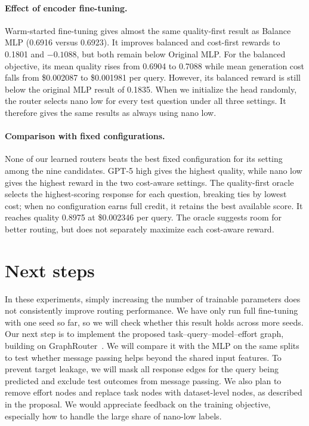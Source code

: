 \documentclass{article}
\begin{document}
\paragraph{Effect of encoder fine-tuning.} Warm-started fine-tuning gives almost the same quality-first result as Balance MLP (0.6916 versus 0.6923). It improves balanced and cost-first rewards to 0.1801 and $-0.1088$, but both remain below Original MLP. For the balanced objective, its mean quality rises from 0.6904 to 0.7088 while mean generation cost falls from \$0.002087 to \$0.001981 per query. However, its balanced reward is still below the original MLP result of 0.1835. When we initialize the head randomly, the router selects nano low for every test question under all three settings. It therefore gives the same results as always using nano low.

\paragraph{Comparison with fixed configurations.} None of our learned routers beats the best fixed configuration for its setting among the nine candidates. GPT-5 high gives the highest quality, while nano low gives the highest reward in the two cost-aware settings. The quality-first oracle selects the highest-scoring response for each question, breaking ties by lowest cost; when no configuration earns full credit, it retains the best available score. It reaches quality 0.8975 at \$0.002346 per query. The oracle suggests room for better routing, but does not separately maximize each cost-aware reward.

\section{Next steps}
In these experiments, simply increasing the number of trainable parameters does not consistently improve routing performance. We have only run full fine-tuning with one seed so far, so we will check whether this result holds across more seeds. Our next step is to implement the proposed task--query--model--effort graph, building on GraphRouter~\cite{graphrouter}. We will compare it with the MLP on the same splits to test whether message passing helps beyond the shared input features. To prevent target leakage, we will mask all response edges for the query being predicted and exclude test outcomes from message passing. We also plan to remove effort nodes and replace task nodes with dataset-level nodes, as described in the proposal. We would appreciate feedback on the training objective, especially how to handle the large share of nano-low labels.
\end{document}
